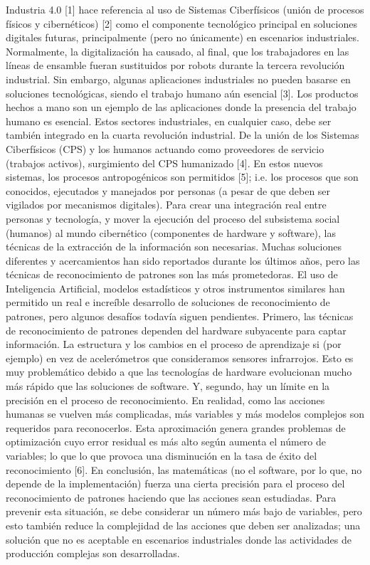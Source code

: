 \documentclass{paper}
\begin{document}
Industria 4.0 [1] hace referencia al uso de Sistemas Ciberfísicos (unión de procesos físicos y cibernéticos) [2] como el componente tecnológico principal en soluciones digitales futuras, principalmente (pero no únicamente) en escenarios industriales. Normalmente, la digitalización ha causado, al final, que los trabajadores en las líneas de ensamble fueran sustituidos por robots durante la tercera revolución industrial.
Sin embargo, algunas aplicaciones industriales no pueden basarse en soluciones tecnológicas, siendo el trabajo humano aún esencial [3]. Los productos hechos a mano son un ejemplo de las aplicaciones donde la presencia del trabajo humano es esencial. Estos sectores industriales, en cualquier caso, debe ser también integrado en la cuarta revolución industrial. De la unión de los Sistemas Ciberfísicos (CPS) y los humanos actuando como proveedores de servicio (trabajos activos), surgimiento del CPS humanizado [4]. En estos nuevos sistemas, los procesos antropogénicos son permitidos [5]; i.e. los procesos que son conocidos, ejecutados y manejados por personas (a pesar de que deben ser vigilados por mecanismos digitales).
Para crear una integración real entre personas y tecnología, y mover la ejecución del proceso del subsistema social (humanos) al mundo cibernético (componentes de hardware y software), las técnicas de la extracción de la información son necesarias. Muchas soluciones diferentes y acercamientos han sido reportados durante los últimos años, pero las técnicas de reconocimiento de patrones son las más prometedoras.
El uso de Inteligencia Artificial, modelos estadísticos y otros instrumentos similares han permitido un real e increíble desarrollo de soluciones de reconocimiento de patrones, pero algunos desafíos todavía siguen pendientes.
Primero, las técnicas de reconocimiento de patrones dependen del hardware subyacente para captar información. La estructura y los cambios en el proceso de aprendizaje si (por ejemplo) en vez de acelerómetros que  consideramos sensores infrarrojos. Esto es muy problemático debido a que las tecnologías de hardware evolucionan mucho más rápido que las soluciones de software.
Y, segundo, hay un límite en la precisión en el proceso de reconocimiento. En realidad, como las acciones humanas se vuelven más complicadas, más variables y más modelos complejos son requeridos para reconocerlos. Esta aproximación genera grandes problemas de optimización cuyo error residual es más alto según aumenta el número de variables; lo que lo que provoca una disminución en la tasa de éxito del reconocimiento [6]. En conclusión, las matemáticas (no el software, por lo que, no depende de la implementación) fuerza una cierta precisión para el proceso del reconocimiento de patrones haciendo que las acciones sean estudiadas. Para prevenir esta situación, se debe considerar un número más bajo de variables, pero esto también reduce la complejidad de las acciones que deben ser analizadas; una solución que no es aceptable en escenarios industriales donde las actividades de producción complejas son desarrolladas.
\end{document}
